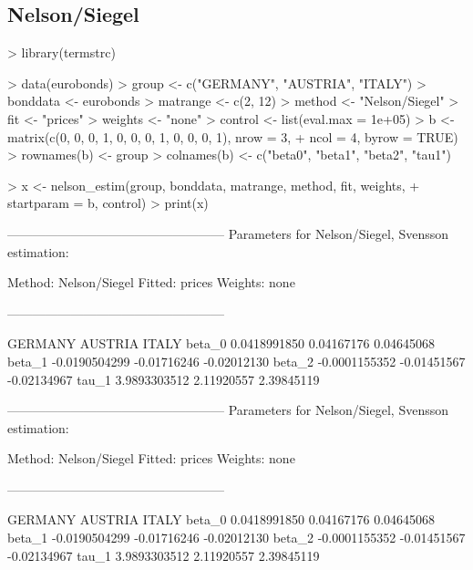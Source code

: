 \subsection{Nelson/Siegel}

\begin{Schunk}
\begin{Sinput}
> library(termstrc)
\end{Sinput}
\end{Schunk}

\begin{Schunk}
\begin{Sinput}
> data(eurobonds)
> group <- c("GERMANY", "AUSTRIA", "ITALY")
> bonddata <- eurobonds
> matrange <- c(2, 12)
> method <- "Nelson/Siegel"
> fit <- "prices"
> weights <- "none"
> control <- list(eval.max = 1e+05)
> b <- matrix(c(0, 0, 0, 1, 0, 0, 0, 1, 0, 0, 0, 1), nrow = 3, 
+     ncol = 4, byrow = TRUE)
> rownames(b) <- group
> colnames(b) <- c("beta0", "beta1", "beta2", "tau1")
\end{Sinput}
\end{Schunk}

\begin{Schunk}
\begin{Sinput}
> x <- nelson_estim(group, bonddata, matrange, method, fit, weights, 
+     startparam = b, control)
> print(x)
\end{Sinput}
\begin{Soutput}
---------------------------------------------------
Parameters for Nelson/Siegel, Svensson estimation:

Method: Nelson/Siegel 
Fitted: prices 
Weights: none 

---------------------------------------------------

             GERMANY     AUSTRIA       ITALY
beta_0  0.0418991850  0.04167176  0.04645068
beta_1 -0.0190504299 -0.01716246 -0.02012130
beta_2 -0.0001155352 -0.01451567 -0.02134967
tau_1   3.9893303512  2.11920557  2.39845119

---------------------------------------------------
Parameters for Nelson/Siegel, Svensson estimation:

Method: Nelson/Siegel 
Fitted: prices 
Weights: none 

---------------------------------------------------

             GERMANY     AUSTRIA       ITALY
beta_0  0.0418991850  0.04167176  0.04645068
beta_1 -0.0190504299 -0.01716246 -0.02012130
beta_2 -0.0001155352 -0.01451567 -0.02134967
tau_1   3.9893303512  2.11920557  2.39845119
\end{Soutput}
\end{Schunk}

